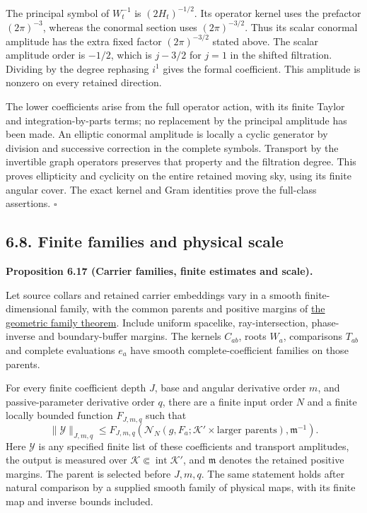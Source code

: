 \documentclass[
  english,
  11pt,
  reqno]{amsart}
\makeatletter
\newcommand{\paperdisplaynext}{%
  \let\paper@savedstartsection\@startsection
  \def\@startsection##1##2##3##4##5##6{%
    \let\@startsection\paper@savedstartsection
    \@tempskipa ##5\relax
    \ifdim\@tempskipa<\z@
      \def\paper@afterskip{.35\baselineskip}%
    \else
      \def\paper@afterskip{##5}%
    \fi
    \@startsection{##1}{##2}{##3}{##4}{\paper@afterskip}{##6}}}
\newcommand{\paperdisplaysection}{\paperdisplaynext\subsection}
\newcommand{\pandocstatementheading}[1]{%
  \par\if@nobreak\else
    \addpenalty{\@beginparpenalty}%
    \addvspace{.5\baselineskip plus .2\baselineskip minus .2\baselineskip}%
  \fi
  {\normalfont\bfseries #1\par}%
  \nobreak\@afterindenttrue\@afterheading
}
\let\paper@displaysection\paperdisplaysection
\renewcommand{\paperdisplaysection}[1]{%
  \let\paper@savedhangfrom\@hangfrom
  \long\def\@hangfrom##1##2{%
    \paper@savedhangfrom{##1}{\paper@headingparagraph##2}}%
  \paper@displaysection{#1}%
  \let\@hangfrom\paper@savedhangfrom}
\makeatother
\begin{document}
The principal symbol of \(W_t^{-1}\) is \((2H_t)^{-1/2}\). Its operator
kernel uses the prefactor \((2\pi)^{-3}\), whereas the conormal section
uses \((2\pi)^{-3/2}\). Thus its scalar conormal amplitude has the extra
fixed factor \((2\pi)^{-3/2}\) stated above. The scalar amplitude order
is \(-1/2\), which is \(j-3/2\) for \(j=1\) in the shifted filtration.
Dividing by the degree rephasing \(i^1\) gives the formal coefficient.
This amplitude is nonzero on every retained direction.

The lower coefficients arise from the full operator action, with its
finite Taylor and integration-by-parts terms; no replacement by the
principal amplitude has been made. An elliptic conormal amplitude is
locally a cyclic generator by division and successive correction in the
complete symbols. Transport by the invertible graph operators preserves
that property and the filtration degree. This proves ellipticity and
cyclicity on the entire retained moving sky, using its finite angular
cover. The exact kernel and Gram identities prove the full-class
assertions. \hfill\(\square\)

\paperdisplaysection{6.8. Finite families and physical
scale}\label{finite-families-and-physical-scale}\label{sec:online-wave-carrier-estimates-scale}

\pandocstatementheading{\leavevmode{}\label{prop:online-wave-carrier-families-scale}Proposition 6.17 (Carrier families, finite estimates and scale).}

Let source collars and retained carrier embeddings vary in a smooth
finite-dimensional family, with the common parents and positive margins
of \hyperref[thm:online-common-collar-finite-families]{the geometric
family theorem}. Include uniform spacelike, ray-intersection,
phase-inverse and boundary-buffer margins. The kernels \(C_{ab}\), roots
\(W_a\), comparisons \(T_{ab}\) and complete evaluations \(e_a\) have
smooth complete-coefficient families on those parents.

For every finite coefficient depth \(J\), base and angular derivative
order \(m\), and passive-parameter derivative order \(q\), there are a
finite input order \(N\) and a finite locally bounded function
\(F_{J,m,q}\) such that%
 \[
\|\mathcal Y\|_{J,m,q}
\le
F_{J,m,q}\left(
\mathcal N_N(g,F_a;\mathcal K'\times\text{larger parents}),
\mathfrak m^{-1}\right).
\] Here \(\mathcal Y\) is any specified finite list of these
coefficients and transport amplitudes, the output is measured over
\(\mathcal K\Subset\operatorname{int}\mathcal K'\), and \(\mathfrak m\)
denotes the retained positive margins. The parent is selected before
\(J,m,q\). The same statement holds after natural comparison by a
supplied smooth family of physical maps, with its finite map and inverse
bounds included.
\end{document}
